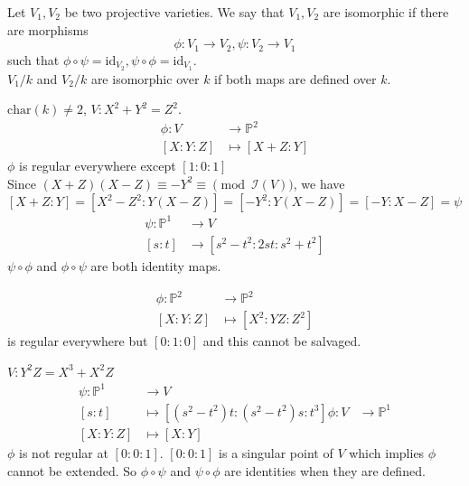 \documentclass[oneside, 12pt]{scrbook}
\newcommand{\I}{\mathcal{I}}
\newcommand{\PP}{\mathbb{P}}
\theoremstyle{theorem}
\begin{document}
\begin{definition}
Let $V_{1},V_{2}$ be two projective varieties. We say that $V_{1},V_{2}$ are isomorphic if there are morphisms $$\phi: V_{1}\rightarrow V_{2}, \psi : V_{2} \rightarrow V_{1}$$ such that $\phi \circ \psi = \mathrm{id}_{V_{2}}, \psi \circ \phi = \mathrm{id}_{V_{1}}$. \\
$V_{1}/k$ and $V_{2}/k$ are isomorphic over $k$ if both maps are defined over $k$.
\end{definition}

\begin{example}
$\mathrm{char}(k) \neq 2$, $V: X^2 + Y^2 = Z^2$. 
\begin{align*}
\phi: V &\rightarrow \PP^2 \\
[X:Y:Z] &\mapsto [X+Z:Y]
\end{align*}
$\phi$ is regular everywhere except $[1:0:1]$\\
Since $(X+Z)(X-Z) \equiv -Y^2 \equiv \pmod{\I(V)}$, we have $[X+Z:Y] = [X^2-Z^2 : Y(X-Z)] = [-Y^2 : Y(X-Z)] = [-Y: X-Z] = \psi$ \\
\begin{align*}
\psi: \PP^1 &\rightarrow V \\
[s:t] &\rightarrow [s^2-t^2 : 2st : s^2 +t^2]
\end{align*}
$\psi\circ \phi$ and $\phi \circ \psi$ are both identity maps.
\end{example}

\begin{example}
\begin{align*}
\phi: \PP^2 &\rightarrow \PP^2 \\
[X:Y:Z] &\mapsto [X^2 : YZ : Z^2]
\end{align*}
 is regular everywhere but $[0:1:0]$ and this cannot be salvaged.
\end{example}

\begin{example}
$V: Y^2Z = X^3 + X^2 Z$
\begin{align*}
\psi: \PP^1 &\rightarrow V \\
[s:t] &\mapsto [(s^2 -t^2)t : (s^2 -t^2)s : t^3]
\phi: V &\rightarrow \PP^1 \\
[X:Y:Z] &\mapsto [X:Y]
\end{align*}
$\phi$ is not regular at $[0:0:1]$. $[0:0:1]$ is a singular point of $V$ which implies $\phi$ cannot be extended. So $\phi \circ \psi$ and $\psi \circ  \phi$ are identities  when they are defined.
\end{example}
\end{document}
